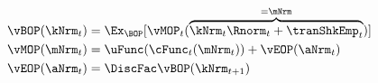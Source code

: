   \begin{equation}\begin{gathered}\begin{aligned}
\vBOP(\kNrm_{t}) & = \Ex_{\BOP}[\vMOP_{t}(\overbrace{\kNrm_{t} \Rnorm_{t} + \tranShkEmp_{t}}^{=\mNrm})] \label{eq:vBOP} \\
\vMOP(\mNrm_{t}) & = \uFunc(\cFunc_{t}(\mNrm_{t})) + \vEOP(\aNrm_{t})\label{eq:vMOP} \\
\vEOP(\aNrm_{t}) & = \DiscFac \vBOP(\kNrm_{t+1})\label{eq:vEOP} \\
      \end{aligned}\end{gathered}\end{equation}
